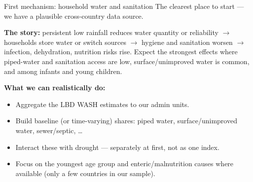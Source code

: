 \documentclass[10pt, aspectratio=169]{beamer}
\begin{document}
\begin{frame}{First mechanism: household water and sanitation}
  The clearest place to start --- we have a plausible cross-country data source.
  \vspace{0.6em}

  \textbf{The story:} persistent low rainfall reduces water quantity or
  reliability $\rightarrow$ households store water or switch sources
  $\rightarrow$ hygiene and sanitation worsen $\rightarrow$ infection,
  dehydration, nutrition risks rise. Expect the strongest effects where
  piped-water and sanitation access are low, surface/unimproved water is
  common, and among infants and young children.
  \vspace{0.6em}

  \textbf{What we can realistically do:}
  \begin{itemize}
    \item Aggregate the LBD WASH estimates to our admin units.
    \item Build baseline (or time-varying) shares: piped water,
          surface/unimproved water, sewer/septic, \ldots
    \item Interact these with drought --- separately at first, not as one index.
    \item Focus on the youngest age group and enteric/malnutrition causes where
          available (only a few countries in our sample).
  \end{itemize}
\end{frame}
\end{document}
